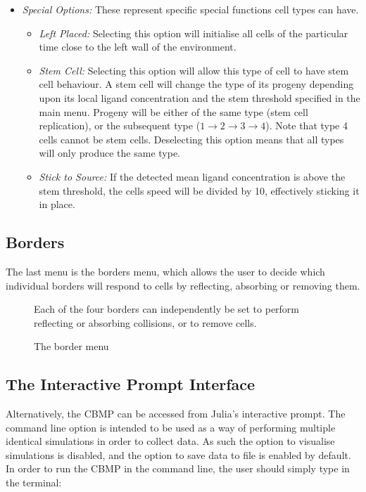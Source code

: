 \documentclass[12pt]{article}
\begin{document}
\begin{itemize}
\item {\itshape Special Options: }These represent specific special 
functions cell types can have.
\begin{itemize}
\item {\itshape Left Placed: }Selecting this option will initialise all 
cells of the particular time close to the left wall of the environment.
\item {\itshape Stem Cell: }Selecting this option will allow this type 
of cell to have stem cell behaviour. A stem cell will change the type of 
its progeny depending upon its local ligand concentration and the stem 
threshold specified in the main menu. Progeny will be either of the same 
type (stem cell replication), or the subsequent type  
(\(1 \rightarrow 2 \rightarrow 3 \rightarrow 4\)). Note that type 4 cells cannot be stem cells. Deselecting this option 
means that all types will only produce the same type.
\item {\itshape Stick to Source: }If the detected mean ligand 
concentration is above the stem threshold, the cells speed will be 
divided by 10, effectively sticking it in place. 
\setcounter{numberedCntE}{\theenumi}
\end{itemize}
\end{itemize}

\subsection{Borders}

The last menu is the borders menu, which allows the user to decide which 
individual borders will respond to cells by reflecting, absorbing or 
removing them.

\begin{figure}[H]
\centering
\caption{The border menu}Each of the four 
borders can independently be set to perform reflecting or absorbing 
collisions, or to remove cells.
\end{figure}

\subsection{The Interactive Prompt Interface}
Alternatively, the CBMP can be accessed from Julia's interactive prompt. 
The command line option is intended to be used as a way of performing 
multiple identical simulations in order to collect data. As such the 
option to visualise simulations is disabled, and the option to save data 
to file is enabled by default. In order to run the CBMP in the command 
line, the user should simply type in the terminal: \\
\end{document}
